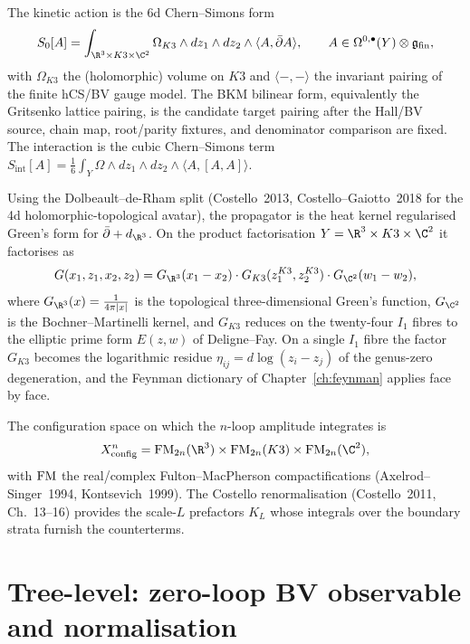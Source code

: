 The kinetic action is the 6d Chern--Simons form
\[
S_0[A]
= \int_{\R^3\times K3\times\C^2}
\Omega_{K3}\wedge dz_1\wedge dz_2
\wedge\langle A, \bar\partial A\rangle,
\qquad A\in \Omega^{0,\bullet}(Y)\otimes \gfrak_{\mathrm{fin}},
\]
with $\Omega_{K3}$ the (holomorphic) volume on $K3$ and
$\langle -,-\rangle$ the invariant pairing of the finite hCS/BV gauge
model. The BKM bilinear form, equivalently the Gritsenko lattice
pairing, is the candidate target pairing after the Hall/BV source,
chain map, root/parity fixtures, and denominator comparison are fixed.
The interaction is the cubic Chern--Simons term
$S_{\mathrm{int}}[A] = \frac{1}{6}\int_Y\Omega\wedge dz_1\wedge dz_2\wedge
\langle A,[A,A]\rangle$.

Using the Dolbeault--de-Rham split (Costello~2013, Costello--Gaiotto~2018
for the 4d holomorphic-topological avatar), the propagator is the heat
kernel regularised Green's form for $\bar\partial + d_{\R^3}$. On the
product factorisation $Y = \R^3\times K3\times\C^2$ it factorises as
\begin{equation}
\label{eq:propagator-factorised}
G(x_1,z_1, x_2,z_2)
= G_{\R^3}(x_1 - x_2)\cdot G_{K3}(z_1^{K3}, z_2^{K3})
\cdot G_{\C^2}(w_1 - w_2),
\end{equation}
where $G_{\R^3}(x) = \frac{1}{4\pi|x|}$ is the topological
three-dimensional Green's function, $G_{\C^2}$ is the Bochner--Martinelli
kernel, and $G_{K3}$ reduces on the twenty-four $I_1$ fibres to the
elliptic prime form $E(z,w)$ of Deligne--Fay. On a single $I_1$ fibre
the factor $G_{K3}$ becomes the logarithmic residue
$\eta_{ij} = d\log(z_i - z_j)$ of the genus-zero degeneration, and the
Feynman dictionary of Chapter~\ref{ch:feynman} applies face by face.

The configuration space on which the $n$-loop amplitude integrates is
\begin{equation}
\label{eq:config-space-6d}
X^n_{\mathrm{config}}
= \FM_{2n}(\R^3)\times \FM_{2n}(K3)\times \FM_{2n}(\C^2),
\end{equation}
with $\mathrm{FM}$ the real/complex Fulton--MacPherson compactifications
(Axelrod--Singer~1994, Kontsevich~1999). The Costello renormalisation
(Costello~2011, Ch.~13--16) provides the scale-$L$ prefactors
$K_L$ whose integrals over the boundary strata furnish the counterterms.

\section{Tree-level: zero-loop BV observable and normalisation}
\label{sec:6d-hcs-tree}

